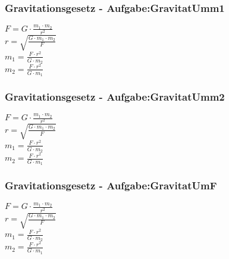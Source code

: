\subsubsection{Gravitationsgesetz - Aufgabe:GravitatUmm1} 
\begin{minipage}{0.45\textwidth} 
$ F = G \cdot  \frac{m_{1} \cdot m_{2} }{  r^{2} } $\\ 
$ r = \sqrt{\frac{G\cdot m_{1} \cdot m_{2} }{   F}} $\\ 
$ m_{1}  =  \frac{F\cdot r^{2} }{G\cdot m_{2} } $\\ 
$ m_{2}  =  \frac{F\cdot r^{2} }{G\cdot m_{1} } $\\ 
\end{minipage} 
\begin{minipage}{0.45\textwidth} 
 
\end{minipage} 
\subsubsection{Gravitationsgesetz - Aufgabe:GravitatUmm2} 
\begin{minipage}{0.45\textwidth} 
$ F = G \cdot  \frac{m_{1} \cdot m_{2} }{  r^{2} } $\\ 
$ r = \sqrt{\frac{G\cdot m_{1} \cdot m_{2} }{   F}} $\\ 
$ m_{1}  =  \frac{F\cdot r^{2} }{G\cdot m_{2} } $\\ 
$ m_{2}  =  \frac{F\cdot r^{2} }{G\cdot m_{1} } $\\ 
\end{minipage} 
\begin{minipage}{0.45\textwidth} 
 
\end{minipage} 
\subsubsection{Gravitationsgesetz - Aufgabe:GravitatUmF} 
\begin{minipage}{0.45\textwidth} 
$ F = G \cdot  \frac{m_{1} \cdot m_{2} }{  r^{2} } $\\ 
$ r = \sqrt{\frac{G\cdot m_{1} \cdot m_{2} }{   F}} $\\ 
$ m_{1}  =  \frac{F\cdot r^{2} }{G\cdot m_{2} } $\\ 
$ m_{2}  =  \frac{F\cdot r^{2} }{G\cdot m_{1} } $\\ 
\end{minipage} 
\begin{minipage}{0.45\textwidth} 
 
\end{minipage} 
